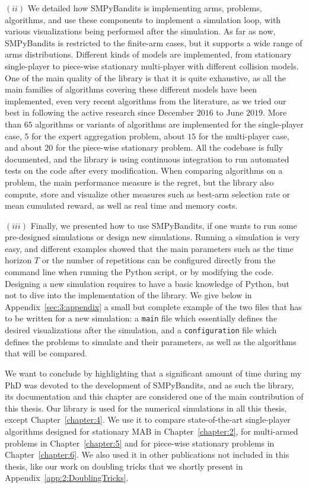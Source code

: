 $(ii)$
We detailed how SMPyBandits is implementing arms, problems, algorithms, and use these components to implement a simulation loop, with various visualizations being performed after the simulation.
As far as now, SMPyBandits is restricted to the finite-arm cases, but it supports a wide range of arms distributions.
Different kinds of models are implemented, from stationary single-player to piece-wise stationary multi-player with different collision models.
One of the main quality of the library is that it is quite exhaustive, as all the main families of algorithms covering these different models have been implemented, even very recent algorithms from the literature, as we tried our best in following the active research since December $2016$ to June $2019$.
More than $65$ algorithms or variants of algorithms are implemented for the single-player case, $5$ for the expert aggregation problem, about $15$ for the multi-player case, and about $20$ for the piece-wise stationary problem.
All the codebase is fully documented, and the library is using continuous integration to run automated tests on the code after every modification.
%
When comparing algorithms on a problem, the main performance measure is the regret, but the library also compute, store and visualize other measures such as best-arm selection rate or mean cumulated reward, as well as real time and memory costs.

$(iii)$
Finally, we presented how to use SMPyBandits, if one wants to run some pre-designed simulations or design new simulations.
Running a simulation is very easy, and different examples showed that the main parameters such as the time horizon $T$ or the number of repetitions can be configured directly from the command line when running the Python script, or by modifying the code.
Designing a new simulation requires to have a basic knowledge of Python, but not to dive into the implementation of the library.
We give below in Appendix~\ref{sec:3:appendix} a small but complete example of the two files that has to be written for a new simulation: a \texttt{main} file which essentially defines the desired visualizations after the simulation, and a \texttt{configuration} file which defines the problems to simulate and their parameters, as well as the algorithms that will be compared.


We want to conclude by highlighting that a significant amount of time during my PhD was devoted to the development of SMPyBandits, and as such the library, its documentation and this chapter  are considered one of the main contribution of this thesis.
%
Our library is used for the numerical simulations in all this thesis, except Chapter~\ref{chapter:4}. We use it to compare state-of-the-art single-player algorithms designed for stationary MAB in Chapter~\ref{chapter:2}, for multi-armed problems in Chapter~\ref{chapter:5} and for piece-wise stationary problems in Chapter~\ref{chapter:6}.
We also used it in other publications not included in this thesis, like our work on doubling tricks \cite{Besson2018DoublingTricks} that we shortly present in Appendix~\ref{app:2:DoublingTricks}.


